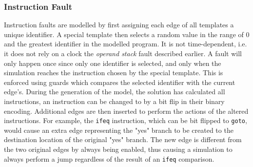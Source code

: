 \subsubsection{Instruction Fault}
Instruction faults are modelled by first assigning each edge of all templates a unique identifier. A special template then selects a random value in the range of $0$ and the greatest identifier in the modelled program. It is not time-dependent, i.e. it does not rely on a clock the \textit{operand stack} fault described earlier. A fault will only happen once since only one identifier is selected, and only when the simulation reaches the instruction chosen by the special template. This is enforced using guards which compares the selected identifier with the current edge's. During the generation of the model, the solution has calculated all instructions, an instruction can be changed to by a bit flip in their binary encoding. Additional edges are then inserted to perform the actions of the altered instructions. For example, the \texttt{ifeq} instruction, which can be bit flipped to \texttt{goto}, would cause an extra edge representing the "yes" branch to be created to the destination location of the original "yes" branch. The new edge is different from the two original edges by always being enabled, thus causing a simulation to always perform a jump regardless of the result of an \texttt{ifeq} comparison.